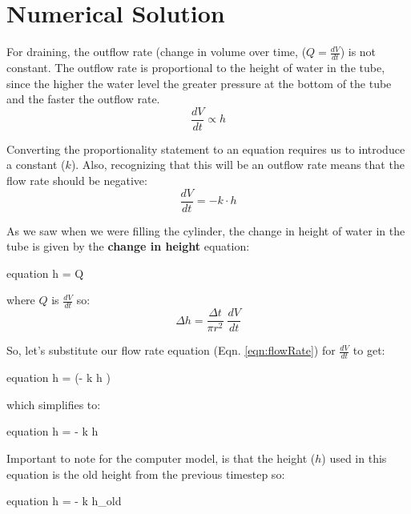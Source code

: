 \documentclass[11pt,fleqn]{book}
\begin{document}
	\section{Numerical Solution}
	
	For draining, the outflow rate (change in volume over time, ($Q=\frac{dV}{dt}$) is not constant. The outflow rate is proportional to the height of water in the tube, since the higher the water level the greater pressure at the bottom of the tube and the faster the outflow rate.
	\begin{equation}
		\frac{dV}{dt} \propto h
	\end{equation}
	
	Converting the proportionality statement to an equation requires us to introduce a constant ($k$). Also, recognizing that this will be an outflow rate means that the flow rate should be negative:
	\begin{equation}
		\label{eqn:flowRate}
		\frac{dV}{dt} = - k \cdot h
	\end{equation}
	
	As we saw when we were filling the cylinder, the change in height of water in the tube is given by the \textbf{change in height} equation:
	\begin{empheq}[box=\fbox]{equation}
		\label{eqn:dh_eqn}
		\Delta h =  \; Q 
	\end{empheq}
	
	where $Q$ is $\frac{dV}{dt}$ so:
	\begin{equation}
		\Delta h = \frac{\Delta t}{\pi r^2} \; \frac{dV}{dt}
	\end{equation}
	
	So, let's substitute our flow rate equation (Eqn. \ref{eqn:flowRate}) for $\frac{dV}{dt}$ to get:
	\begin{empheq}[]{equation}
		\Delta h =  \; (- k \cdot h )
	\end{empheq}

	which simplifies to:
	\begin{empheq}[]{equation}
		\Delta h = -  \; k \cdot h
	\end{empheq}
	
	Important to note for the computer model, is that the height ($h$) used in this equation is the old height from the previous timestep so:
	\begin{empheq}[box=\fbox]{equation}
		\label{eqn:dh_drain}
		\Delta h = -  \; k \cdot h_{old}
	\end{empheq}
	
\end{document}

